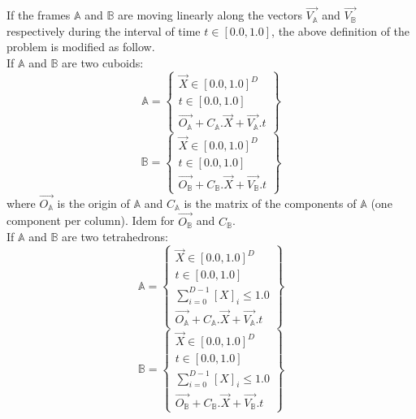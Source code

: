 \documentclass[12pt, a4paper]{article}
\begin{document}
If the frames $\mathbb{A}$ and $\mathbb{B}$ are moving linearly along the vectors $\overrightarrow{V_\mathbb{A}}$ and $\overrightarrow{V_\mathbb{B}}$ respectively during the interval of time $t\in[0.0,1.0]$, the above definition of the problem is modified as follow.\\

If $\mathbb{A}$ and $\mathbb{B}$ are two cuboids:
\begin{equation}
\mathbb{A}=\left\lbrace
\begin{array}{c}
\overrightarrow{X}\in[0.0,1.0]^D\\
t\in[0.0,1.0]\\
\overrightarrow{O_\mathbb{A}}+C_\mathbb{A}.\overrightarrow{X}+\overrightarrow{V_\mathbb{A}}.t
\end{array}
\right\rbrace
\end{equation}
\begin{equation}
\mathbb{B}=\left\lbrace
\begin{array}{c}
\overrightarrow{X}\in[0.0,1.0]^D\\
t\in[0.0,1.0]\\
\overrightarrow{O_\mathbb{B}}+C_\mathbb{B}.\overrightarrow{X}+\overrightarrow{V_\mathbb{B}}.t
\end{array}
\right\rbrace
\end{equation}
where $\overrightarrow{O_\mathbb{A}}$ is the origin of $\mathbb{A}$ and $C_\mathbb{A}$ is the matrix of the components of $\mathbb{A}$ (one component per column). Idem for $\overrightarrow{O_\mathbb{B}}$ and $C_\mathbb{B}$.\\

If $\mathbb{A}$ and $\mathbb{B}$ are two tetrahedrons:
\begin{equation}
\mathbb{A}=\left\lbrace
\begin{array}{c}
\overrightarrow{X}\in[0.0,1.0]^D\\
t\in[0.0,1.0]\\
\sum_{i=0}^{D-1}\left[X\right]_i\le1.0\\
\overrightarrow{O_\mathbb{A}}+C_\mathbb{A}.\overrightarrow{X}+\overrightarrow{V_\mathbb{A}}.t
\end{array}
\right\rbrace
\end{equation}
\begin{equation}
\mathbb{B}=\left\lbrace
\begin{array}{c}
\overrightarrow{X}\in[0.0,1.0]^D\\
t\in[0.0,1.0]\\
\sum_{i=0}^{D-1}\left[X\right]_i\le1.0\\
\overrightarrow{O_\mathbb{B}}+C_\mathbb{B}.\overrightarrow{X}+\overrightarrow{V_\mathbb{B}}.t
\end{array}
\right\rbrace
\end{equation}
\end{document}
